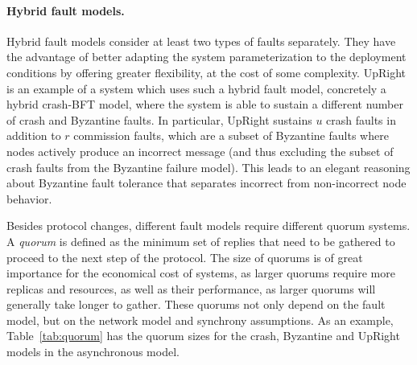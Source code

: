 \paragraph{Hybrid fault models.}
Hybrid fault models consider at least two types of faults
separately. They have the advantage of better adapting the
system parameterization to the deployment conditions by offering
greater flexibility, at the cost of some complexity.
UpRight~\cite{upright} is an example of a system which uses such
a hybrid fault model, concretely a hybrid crash-\ac{BFT} model, where
the system is able to sustain a different number of crash and
Byzantine faults. In particular, UpRight sustains $u$ crash faults in addition
to $r$ commission faults, which are a subset of Byzantine faults
where nodes actively produce an incorrect message (and thus
excluding the subset of crash faults from the Byzantine failure
model). This leads to an elegant reasoning about Byzantine fault
tolerance that separates incorrect from non-incorrect node
behavior.

Besides protocol changes, different fault models require
different quorum systems. A \emph{quorum} is defined as the
minimum set of replies that need to be gathered to proceed to the
next step of the protocol. The size of quorums is of great
importance for the economical cost of systems, as larger quorums require
more replicas and resources, as well as their performance, as
larger quorums will generally take longer to gather. These
quorums not only depend on the fault model, but on the network
model and synchrony assumptions. As an example,
Table~\ref{tab:quorum} has the quorum sizes for the crash,
Byzantine and UpRight models in the asynchronous model.

